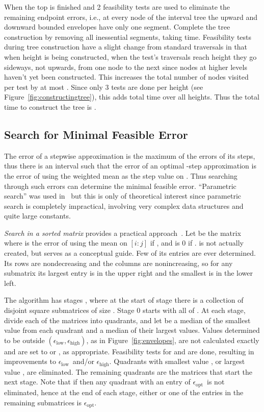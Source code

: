 \documentclass[11pt]{article}
\newcommand{\inter}[2]{\ensuremath{[#1\!:\!#2]}}
\newcommand{\epslow}{\ensuremath{\epsilon_\mathrm{low}}}
\newcommand{\epshigh}{\ensuremath{\epsilon_\mathrm{high}}}
\newcommand{\epsopt}{\ensuremath{\epsilon_\mathrm{opt}}}
\newcommand{\epsinterval}[1]{\ensuremath{(\epslow,\epshigh#1}}
\begin{document}
When the top is finished  and 2 feasibility tests are used to eliminate the remaining endpoint errors, i.e., at every node of the interval tree the upward and downward bounded envelopes have only one segment.
Complete the tree construction by removing all inessential segments, taking  time.
Feasibility tests during tree construction have a slight change from standard traversals in that when height  is being constructed, when the test's traversals reach height  they go sideways, not upwards, from one node to the next since nodes at higher levels haven't yet been constructed.
This increases the total number of nodes visited per test by at most .
Since only 3 tests are done per height (see Figure~\ref{fig:constructingtree}), this adds  total time over all heights.
Thus the total time to construct the tree is .



\subsection{Search for Minimal Feasible Error} \label{sec:SortedMatrix}


The  error of a stepwise approximation is the maximum of the  errors of its steps,
thus there is an interval  such that the error of an optimal -step approximation is the error of using the weighted  mean as the step value on .
Thus searching through such errors can determine the minimal feasible error.
``Parametric search'' was used in~\cite{FournierVigneronLinftyParametric,JQReducedIso_IF2012} but this is only of theoretical interest since parametric search is completely impractical, involving very complex data structures and quite large constants.

\textit{Search in a sorted matrix} provides a practical approach~\cite{FredericksonJohnsonSortedMatrix}.
Let  be the  matrix where  is the error of using the  mean on \inter{i}{j} if , and is 0 if .
 is not actually created, but serves as a conceptual guide.
Few of its entries are ever determined.
Its rows are nondecreasing and the columns are nonincreasing, so
for any submatrix its largest entry is in the upper right and the smallest is in the lower left.

The algorithm has stages , where at the start of stage  there is a collection of disjoint square submatrices of size .
Stage 0 starts with all of .
At each stage, divide each of the matrices into quadrants, and let  be a median of the smallest value from each quadrant and  a median of their largest values.
Values determined to be outside \epsinterval{)}, as in Figure~\ref{fig:envelopes}, are not calculated exactly and are set to  or , as appropriate.
Feasibility tests for  and  are done, resulting in improvements to \epslow\ and/or \epshigh.
Quadrants with smallest value , or largest value , are eliminated.
The remaining quadrants are the matrices that start the next stage.
Note that if  then any quadrant with an entry of \epsopt\ is not eliminated,
hence at the end of each stage, either  or one of the entries in the remaining submatrices is \epsopt.
\end{document}
